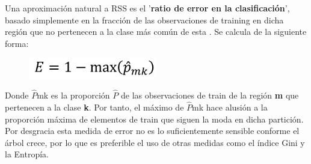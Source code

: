 Una aproximación natural a RSS es el '\textbf{ratio de error en la clasificación}', basado simplemente en la fracción de las observaciones de training en dicha región que no pertenecen a la clase más común de esta \cite{ref7}. Se calcula de la siguiente forma:

\begin{figure}[H]
	\centering
	\includegraphics[width=0.5\textwidth]{imagenes/cer} 
\end{figure}

Donde $\widehat{P}$mk es la proporción $\widehat{P}$ de las observaciones de train de la región \textbf{m} que pertenecen a la clase \textbf{k}. Por tanto, el máximo de $\widehat{P}$mk hace alusión a la proporción máxima de elementos de train que siguen la moda en dicha partición.\\
Por desgracia esta medida de error no es lo suficientemente sensible conforme el árbol crece, por lo que es preferible el uso de otras medidas como el índice Gini y la Entropía.

